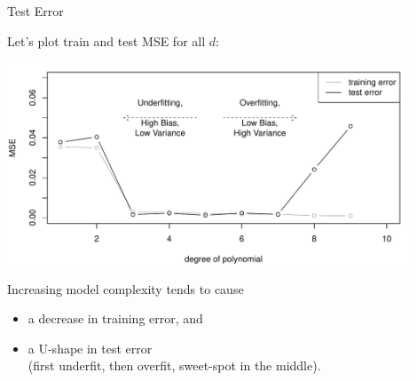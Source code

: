 \begin{vbframe}{Test Error}

Let's plot train and test MSE for all $d$:

\includegraphics[width=0.9\textwidth]{figure/eval_test_3} 

Increasing model complexity tends to cause

\begin{itemize}
  \item a decrease in training error, and\\
  \item a U-shape in test error\\ 
  (first underfit, then overfit, sweet-spot in the middle).
  \end{itemize}
  
\end{vbframe}



